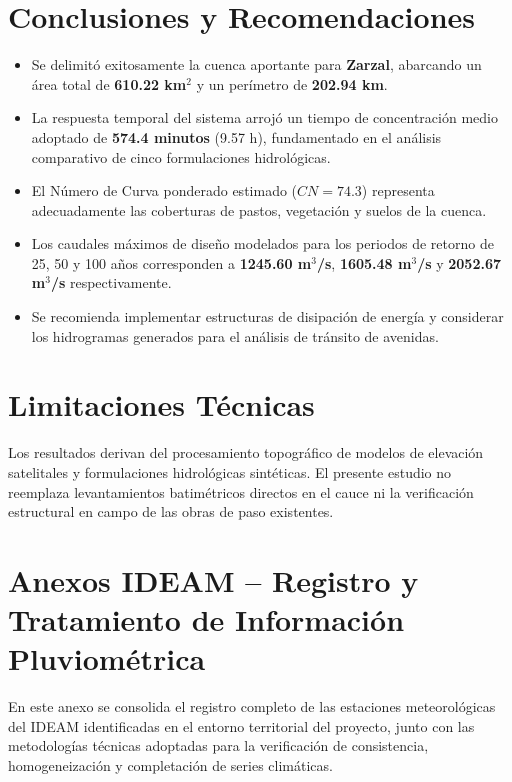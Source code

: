 \documentclass[11pt,a4paper]{article}
\begin{document}
\section{Conclusiones y Recomendaciones}
\begin{itemize}
\item Se delimitó exitosamente la cuenca aportante para \textbf{Zarzal}, abarcando un área total de \textbf{610.22 km$^2$} y un perímetro de \textbf{202.94 km}.
\item La respuesta temporal del sistema arrojó un tiempo de concentración medio adoptado de \textbf{574.4 minutos} (9.57 h), fundamentado en el análisis comparativo de cinco formulaciones hidrológicas.
\item El Número de Curva ponderado estimado ($CN = 74.3$) representa adecuadamente las coberturas de pastos, vegetación y suelos de la cuenca.
\item Los caudales máximos de diseño modelados para los periodos de retorno de 25, 50 y 100 años corresponden a \textbf{1245.60 m$^3$/s}, \textbf{1605.48 m$^3$/s} y \textbf{2052.67 m$^3$/s} respectivamente.
\item Se recomienda implementar estructuras de disipación de energía y considerar los hidrogramas generados para el análisis de tránsito de avenidas.
\end{itemize}

\section{Limitaciones Técnicas}
Los resultados derivan del procesamiento topográfico de modelos de elevación satelitales y formulaciones hidrológicas sintéticas. El presente estudio no reemplaza levantamientos batimétricos directos en el cauce ni la verificación estructural en campo de las obras de paso existentes.

\newpage
\section{Anexos IDEAM -- Registro y Tratamiento de Información Pluviométrica}
En este anexo se consolida el registro completo de las estaciones meteorológicas del IDEAM identificadas en el entorno territorial del proyecto, junto con las metodologías técnicas adoptadas para la verificación de consistencia, homogeneización y completación de series climáticas.
\end{document}
